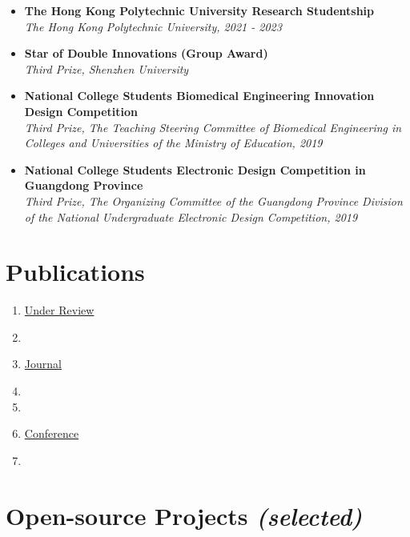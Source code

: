 \documentclass[letterpaper,11pt]{article}
\begin{document}
    \begin{itemize}[leftmargin=0.15in, label={}, itemsep=0em]
        \item \textbf{The Hong Kong Polytechnic University Research Studentship}\\
        \emph{The Hong Kong Polytechnic University, 2021 - 2023}
        \item \textbf{Star of Double Innovations (Group Award)}\\
        \emph{Third Prize, Shenzhen University}
        \item \textbf{National College Students Biomedical Engineering Innovation Design Competition}\\
        \emph{Third Prize, The Teaching Steering Committee of Biomedical Engineering in Colleges and Universities of the Ministry of Education, 2019}
        \item \textbf{National College Students Electronic Design Competition in Guangdong Province}\\
        \emph{Third Prize, The Organizing Committee of the Guangdong Province Division of the National Undergraduate Electronic Design Competition, 2019}
    \end{itemize}

    \section{Publications}

    

    \begin{enumerate}[leftmargin=0.15in, label={}, itemsep=0em]
        \item \underline{Under Review}
        \item {}
        
        \item \underline{Journal}
        \item {}
        \item {}
        
        \item \underline{Conference}
        \item {}
    \end{enumerate}

    \section{Open-source Projects \emph{(selected)}}
\end{document}
